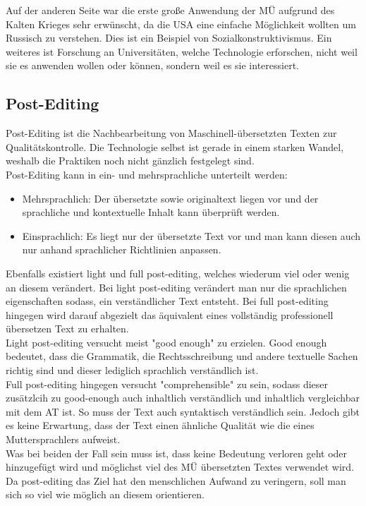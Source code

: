 \documentclass{article}
\begin{document}
	Auf der anderen Seite war die erste große Anwendung der MÜ aufgrund des Kalten Krieges sehr erwünscht, da die USA eine einfache Möglichkeit wollten um Russisch zu verstehen. Dies ist ein Beispiel von Sozialkonstruktivismus. Ein weiteres ist Forschung an Universitäten, welche Technologie erforschen, nicht weil sie es anwenden wollen oder können, sondern weil es sie interessiert.\\
	\subsection{Post-Editing}
	Post-Editing ist die Nachbearbeitung von Maschinell-übersetzten Texten zur Qualitätskontrolle. Die Technologie selbst ist gerade in einem starken Wandel, weshalb die Praktiken noch nicht gänzlich festgelegt sind. \\
	Post-Editing kann in ein- und mehrsprachliche unterteilt werden: \\
	\begin{itemize}
		\item{Mehrsprachlich: Der übersetzte sowie originaltext liegen vor und der sprachliche und kontextuelle Inhalt kann überprüft werden.}
		\item{Einsprachlich: Es liegt nur der übersetzte Text vor und man kann diesen auch nur anhand sprachlicher Richtlinien anpassen.}
	\end{itemize}
	Ebenfalls existiert light und full post-editing, welches wiederum viel oder wenig an diesem verändert. Bei light post-editing verändert man nur die sprachlichen eigenschaften sodass, ein verständlicher Text entsteht. Bei full post-editing hingegen wird darauf abgezielt das äquivalent eines vollständig professionell übersetzen Text zu erhalten. \\
	Light post-editing versucht meist "good enough" zu erzielen. Good enough bedeutet, dass die Grammatik, die Rechtsschreibung und andere textuelle Sachen richtig sind und dieser lediglich sprachlich verständlich ist. \\
	Full post-editing hingegen versucht "comprehensible" zu sein, sodass dieser zusätzlcih zu good-enough auch inhaltlich verständlich und inhaltlich vergleichbar mit dem AT ist. So muss der Text auch syntaktisch verständlich sein. Jedoch gibt es keine Erwartung, dass der Text einen ähnliche Qualität wie die eines Muttersprachlers aufweist. \\
	Was bei beiden der Fall sein muss ist, dass keine Bedeutung verloren geht oder hinzugefügt wird und möglichst viel des MÜ übersetzten Textes verwendet wird. Da post-editing das Ziel hat den menschlichen Aufwand zu veringern, soll man sich so viel wie möglich an diesem orientieren. \\
\end{document}
